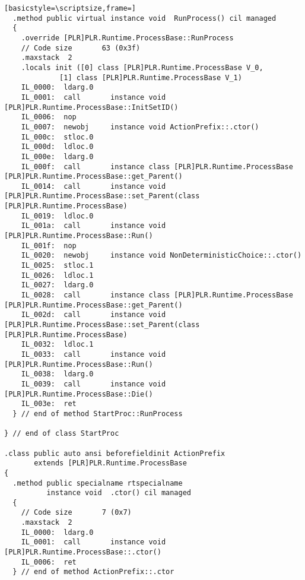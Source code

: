 \begin{lstlisting}[basicstyle=\scriptsize,frame=]
  .method public virtual instance void  RunProcess() cil managed
  {
    .override [PLR]PLR.Runtime.ProcessBase::RunProcess
    // Code size       63 (0x3f)
    .maxstack  2
    .locals init ([0] class [PLR]PLR.Runtime.ProcessBase V_0,
             [1] class [PLR]PLR.Runtime.ProcessBase V_1)
    IL_0000:  ldarg.0
    IL_0001:  call       instance void [PLR]PLR.Runtime.ProcessBase::InitSetID()
    IL_0006:  nop
    IL_0007:  newobj     instance void ActionPrefix::.ctor()
    IL_000c:  stloc.0
    IL_000d:  ldloc.0
    IL_000e:  ldarg.0
    IL_000f:  call       instance class [PLR]PLR.Runtime.ProcessBase [PLR]PLR.Runtime.ProcessBase::get_Parent()
    IL_0014:  call       instance void [PLR]PLR.Runtime.ProcessBase::set_Parent(class [PLR]PLR.Runtime.ProcessBase)
    IL_0019:  ldloc.0
    IL_001a:  call       instance void [PLR]PLR.Runtime.ProcessBase::Run()
    IL_001f:  nop
    IL_0020:  newobj     instance void NonDeterministicChoice::.ctor()
    IL_0025:  stloc.1
    IL_0026:  ldloc.1
    IL_0027:  ldarg.0
    IL_0028:  call       instance class [PLR]PLR.Runtime.ProcessBase [PLR]PLR.Runtime.ProcessBase::get_Parent()
    IL_002d:  call       instance void [PLR]PLR.Runtime.ProcessBase::set_Parent(class [PLR]PLR.Runtime.ProcessBase)
    IL_0032:  ldloc.1
    IL_0033:  call       instance void [PLR]PLR.Runtime.ProcessBase::Run()
    IL_0038:  ldarg.0
    IL_0039:  call       instance void [PLR]PLR.Runtime.ProcessBase::Die()
    IL_003e:  ret
  } // end of method StartProc::RunProcess

} // end of class StartProc

.class public auto ansi beforefieldinit ActionPrefix
       extends [PLR]PLR.Runtime.ProcessBase
{
  .method public specialname rtspecialname 
          instance void  .ctor() cil managed
  {
    // Code size       7 (0x7)
    .maxstack  2
    IL_0000:  ldarg.0
    IL_0001:  call       instance void [PLR]PLR.Runtime.ProcessBase::.ctor()
    IL_0006:  ret
  } // end of method ActionPrefix::.ctor


\end{lstlisting}
